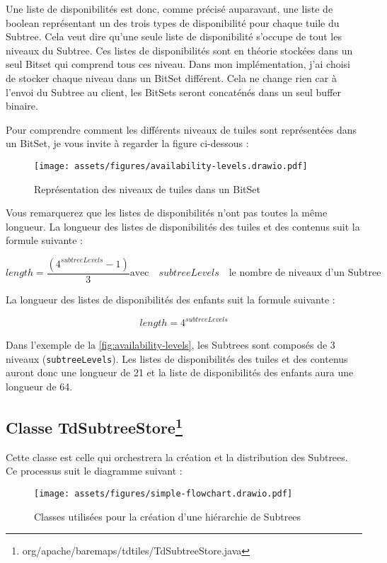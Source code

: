 Une liste de disponibilités est donc, comme précisé auparavant, une liste de boolean représentant un des trois types de disponibilité pour chaque tuile du Subtree. Cela veut dire qu'une seule liste de disponibilité s'occupe de tout les niveaux du Subtree. Ces listes de disponibilités sont en théorie stockées dans un seul Bitset qui comprend tous ces niveau. Dans mon implémentation, j'ai choisi de stocker chaque niveau dans un BitSet différent. Cela ne change rien car à l'envoi du Subtree au client, les BitSets seront concaténés dans un seul buffer binaire.

Pour comprendre comment les différents niveaux de tuiles sont représentées dans un BitSet, je vous invite à regarder la figure ci-dessous :

\begin{figure}[H]
    \centering
    \texttt{[image: assets/figures/availability-levels.drawio.pdf]}
    \caption{Représentation des niveaux de tuiles dans un BitSet}
    \label{fig:availability-levels}
\end{figure}

Vous remarquerez que les listes de disponibilités n'ont pas toutes la même longueur. La longueur des listes de disponibilités des tuiles et des contenus suit la formule suivante :

\[
length = \frac{(4^{subtreeLevels} - 1)}{3} \text{avec} \quad subtreeLevels \quad \text{le nombre de niveaux d'un Subtree}
\]

La longueur des listes de disponibilités des enfants suit la formule suivante :

\[
length = 4^{subtreeLevels}
\]

Dans l'exemple de la \autoref{fig:availability-levels}, les Subtrees sont composés de 3 niveaux (\texttt{subtreeLevels}). Les listes de disponibilités des tuiles et des contenus auront donc une longueur de 21 et la liste de disponibilités des enfants aura une longueur de 64.

\newpage
\subsection*{Classe TdSubtreeStore\footnote{org/apache/baremaps/tdtiles/TdSubtreeStore.java}}
\label{sec:tdsubtreestore-class}

Cette classe est celle qui orchestrera la création et la distribution des Subtrees. Ce processus suit le diagramme suivant :

\begin{figure}[H]
    \centering
    \texttt{[image: assets/figures/simple-flowchart.drawio.pdf]}
    \caption{Classes utilisées pour la création d'une hiérarchie de Subtrees}
    \label{fig:ssimple-flowchart}
\end{figure}

